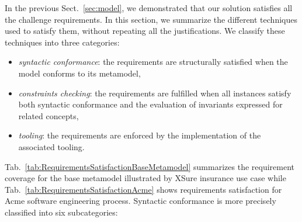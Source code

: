 
In the previous Sect.~\ref{sec:model}, we demonstrated that our solution satisfies all the challenge requirements. In this section, we summarize the different techniques used to satisfy them, without repeating all the justifications. We classify these techniques into three categories:
\begin{itemize}
    \item \emph{syntactic conformance}: the requirements are structurally satisfied when the model conforms to its metamodel,
    \item \emph{constraints checking}: the requirements are fulfilled when all instances satisfy both syntactic conformance and the evaluation of invariants expressed for related concepts,
    \item \emph{tooling}: the requirements are enforced by the implementation of the associated tooling.
\end{itemize}


Tab.~\ref{tab:RequirementsSatisfactionBaseMetamodel} summarizes the requirement coverage for the base metamodel illustrated by XSure insurance use case while Tab.~\ref{tab:RequirementsSatisfactionAcme} shows requirements satisfaction for Acme software engineering process. Syntactic conformance is more precisely classified into six subcategories:

